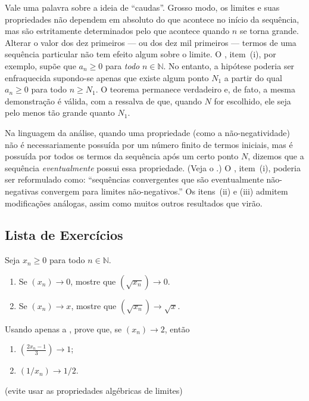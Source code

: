 Vale uma palavra sobre a ideia de ``caudas''. Grosso modo, os limites e suas propriedades não dependem em absoluto do que acontece no início da sequência, mas são estritamente determinados pelo que acontece quando $n$ se torna grande. Alterar o valor dos dez primeiros --- ou dos dez mil primeiros --- termos de uma sequência particular não tem efeito algum sobre o limite. O , item~(i), por exemplo, supõe que $a_n \geq 0$ para \textit{todo} $n \in \mathbb{N}$. No entanto, a hipótese poderia ser enfraquecida supondo-se apenas que existe algum ponto $N_1$ a partir do qual $a_n \geq 0$ para todo $n \geq N_1$. O teorema permanece verdadeiro e, de fato, a mesma demonstração é válida, com a ressalva de que, quando $N$ for escolhido, ele seja pelo menos tão grande quanto $N_1$. 

Na linguagem da análise, quando uma propriedade (como a não-negatividade) não é necessariamente possuída por um número finito de termos iniciais, mas é possuída por todos os termos da sequência após um certo ponto $N$, dizemos que a sequência \textit{eventualmente} possui essa propriedade. (Veja o .) O , item~(i), poderia ser reformulado como: ``sequências convergentes que são eventualmente não-negativas convergem para limites não-negativos.'' Os itens~(ii) e (iii) admitem modificações análogas, assim como muitos outros resultados que virão.

\subsection{Lista de Exercícios}\label{subsec:exercicios-teoremas-limite}

\begin{exercise}\label{ex:2-3-1}
Seja $x_n \geq 0$ para todo $n \in \mathbb{N}$.
\begin{enumerate}[label=(\alph*)]
\item Se $(x_n) \to 0$, mostre que $(\sqrt{x_n}) \to 0$.
\item Se $(x_n) \to x$, mostre que $(\sqrt{x_n}) \to \sqrt{x}$.
\end{enumerate}
\end{exercise}

\begin{exercise}\label{ex:2-3-2}
Usando apenas a , prove que, se $(x_n) \to 2$, então
\begin{enumerate}[label=(\alph*)]
\item $\displaystyle \left( \frac{2x_n - 1}{3} \right) \to 1$;
\item $(1 / x_n) \to 1/2$.
\end{enumerate}
(evite usar as propriedades algébricas de limites)
\end{exercise}

